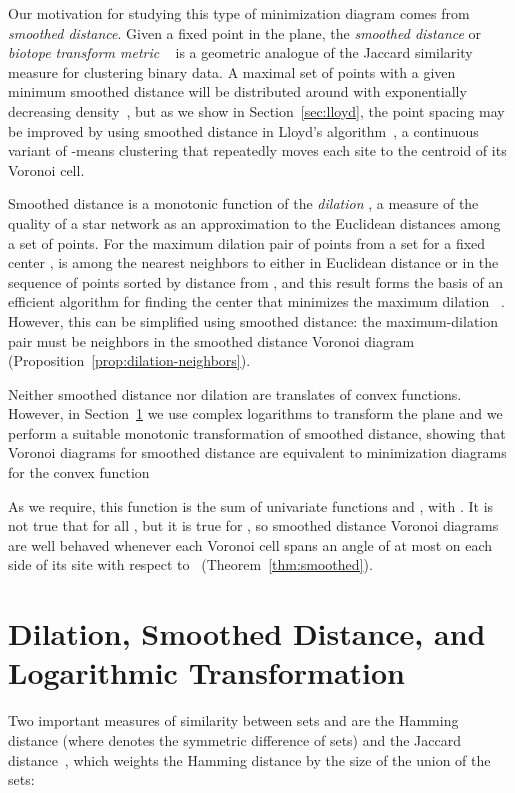 \documentclass[10pt, conference, compsocconf]{IEEEtran}
\begin{document}
Our motivation for studying this type of minimization diagram comes from \emph{smoothed distance}. Given a fixed point  in the plane, the \emph{smoothed distance} or \emph{biotope transform metric} ~\cite{Cla-UCI-08,DezDez-09} is a geometric analogue of the Jaccard similarity measure for clustering binary data.  A maximal set of points with a given minimum smoothed distance will be distributed around  with exponentially decreasing density~\cite{Cla-UCI-08}, but as we show in Section~\ref{sec:lloyd}, the point spacing may be improved by using smoothed distance in Lloyd's algorithm~\cite{DuFabGun-SR-99,Llo-ITIT-82}, a continuous variant of -means clustering that repeatedly moves each site to the centroid of its Voronoi cell.

Smoothed distance is a monotonic function of the \emph{dilation} , a measure of the quality of a star network as an approximation to the Euclidean distances among a set of points. For the maximum dilation pair of points  from a set  for a fixed center ,  is among the  nearest neighbors to  either in Euclidean distance or in the sequence of points sorted by distance from , and this result forms the basis of an efficient algorithm for finding the center  that minimizes the maximum dilation~\cite{EppWor-CGTA-07} . However, this can be simplified using smoothed distance: the maximum-dilation pair must be neighbors in the smoothed distance Voronoi diagram (Proposition~\ref{prop:dilation-neighbors}).

Neither smoothed distance nor dilation are translates of convex functions. However, in Section~\ref{sec:xform} we use complex logarithms to transform the plane and we perform a suitable monotonic transformation of smoothed distance, showing that Voronoi diagrams for smoothed distance are equivalent to minimization diagrams for the convex function

As we require, this function is the sum of univariate functions  and , with . It is not true that  for all , but it is true for , so smoothed distance Voronoi diagrams are well behaved whenever each Voronoi cell spans an angle of at most  on each side of its site with respect to~ (Theorem~\ref{thm:smoothed}).

\section{Dilation, Smoothed Distance, and Logarithmic Transformation}
\label{sec:xform}

Two important measures of similarity between sets  and  are the Hamming distance  (where  denotes the symmetric difference of sets) and the Jaccard distance~\cite{Jac-BSV-01}, which weights the Hamming distance by the size of the union of the sets:
\end{document}

